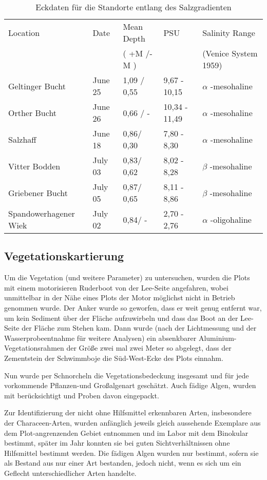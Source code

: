 \begin{table}[htb]
\caption{Eckdaten für die Standorte entlang des Salzgradienten}
\begin{tabular}{lllll}
\toprule
 Location				& Date		& Mean Depth	& PSU 			& Salinity Range   \\
 						& 			& ( +M /-M )	& 				& (Venice System 1959)\\
\midrule
Geltinger Bucht 		& June 25	& 1,09 / 0,55	& 9,67 - 10,15 	& $ \alpha $ -mesohaline\\ 
Orther Bucht			& June 26 	& 0,66 / -		& 10,34 - 11,49 & $ \alpha $ -mesohaline\\
Salzhaff 				& June 18 	& 0,86/ 0,30	& 7,80 - 8,30  	& $ \alpha $ -mesohaline\\
\midrule
Vitter Bodden			& July 03 	& 0,83/ 0,62	& 8,02 - 8,28  	& $ \beta $ -mesohaline\\
Griebener Bucht			& July 05 	& 0,87/ 0,65	& 8,11 - 8,86	& $ \beta $ -mesohaline\\
\midrule
Spandowerhagener Wiek 	& July 02 	& 0,84/ -		& 2,70 - 2,76  	& $ \alpha $ -oligohaline\\
\bottomrule
\end{tabular}
\label{Salztabelle}
\end{table}


\subsection{Vegetationskartierung}

Um die Vegetation (und weitere Parameter) zu untersuchen, wurden die Plots mit einem motorisieren Ruderboot von der Lee-Seite angefahren, wobei unmittelbar in der Nähe eines Plots der Motor möglichst nicht in Betrieb genommen wurde. Der Anker wurde so geworfen, dass er weit genug entfernt war, um kein Sediment über der Fläche aufzuwirbeln und dass das Boot an der Lee-Seite der Fläche zum Stehen kam. Dann wurde (nach der Lichtmessung und der Wasserprobeentnahme für weitere Analysen) ein absenkbarer Aluminium-Vegetationsrahmen der Größe zwei mal zwei Meter so abgelegt, dass der Zementstein der Schwimmboje die Süd-West-Ecke des Plots einnahm.

Nun wurde per Schnorcheln die Vegetationsbedeckung insgesamt und für jede vorkommende Pflanzen-und Großalgenart geschätzt. Auch fädige Algen, wurden mit berücksichtigt und Proben davon eingepackt. 

Zur Identifizierung der nicht ohne Hilfsmittel erkennbaren Arten, insbesondere der Characeen-Arten, wurden anfänglich jeweils gleich aussehende Exemplare aus dem Plot-angrenzenden Gebiet entnommen und im Labor mit dem Binokular bestimmt, später im Jahr konnten sie bei guten Sichtverhältnissen ohne Hilfsmittel bestimmt werden. Die fädigen Algen wurden nur bestimmt, sofern sie als Bestand aus nur einer Art bestanden, jedoch nicht, wenn es sich um ein Geflecht unterschiedlicher Arten handelte.

